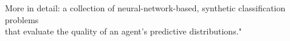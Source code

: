 \documentclass[preview]{standalone}
\begin{document}
\begin{center}
More in detail: a collection of neural-network-based, synthetic classification problems \\
            that evaluate the quality of an agent’s predictive distributions."
\end{center}
\end{document}
